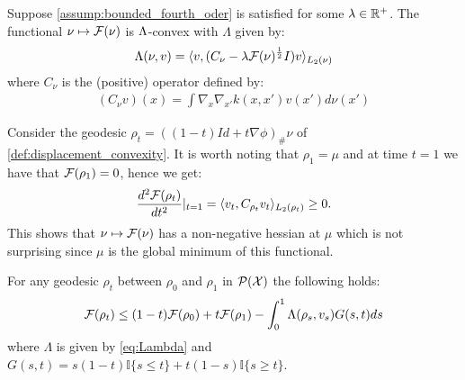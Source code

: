 \begin{proposition}
\label{prop:lambda_convexity} Suppose \cref{assump:bounded_fourth_oder} is satisfied for some $\lambda \in {{\mathbb R}}^+$. The functional $\nu\mapsto {{\mathcal F}}(\nu)$ is $\text{\ensuremath{\Lambda}}$-convex
with $\Lambda$ given by:
\begin{equation}
\Lambda(\nu,v)=\langle v,(C_{\nu}-\lambda {{\mathcal F}}(\nu)^{\frac{1}{2}}I)v\rangle_{L_{2}(\nu)}\label{eq:Lambda}
\end{equation}
where $C_{\nu}$ is the (positive) operator defined by:
\begin{align}\label{eq:positive_operator_C}
	(C_{\nu}v)(x)=\int\nabla_{x}\nabla_{x'}k(x,x')v(x')d\nu(x')
\end{align}
\end{proposition}
%
%
Consider the geodesic $\rho_{t}=((1-t)Id+t\nabla\phi)_{\#}\nu$ of \cref{def:displacement_convexity}. It is worth noting that $\rho_{1}=\mu$ and at time $t=1$ we have
that ${{\mathcal F}}(\rho_{1})=0$, hence we get:
\[
\frac{d^{2}{{\mathcal F}}(\rho_{t})}{dt^{2}}\vert_{t=1}=\langle v_{t},C_{\rho_{t}}v_{t}\rangle_{L_{2}(\rho_{t})}\geq0.
\]
This shows that $\nu\mapsto {{\mathcal F}}(\nu)$ has a non-negative
hessian at $\mu$ which is not surprising since $\mu$ is the global
minimum of this functional.
\begin{corollary}\label{cor:integral_lambda_convexity}
For any geodesic $\rho_{t}$ between
$\rho_{0}$ and $\rho_{1}$ in $\mathcal{P}({{\mathcal X}})$ the following holds:
\begin{equation}
{{\mathcal F}}(\rho_{t})\leq(1-t){{\mathcal F}}(\rho_{0})+t{{\mathcal F}}(\rho_{1})-\int_{0}^{1}\Lambda(\rho_{s},v_{s})G(s,t)ds\label{eq:integral_lambda_convexity}
\end{equation}
where $\Lambda$ is given by \cref{eq:Lambda} and $G(s,t)=s(1-t) \mathbb{I}\{s\leq t\}
+t(1-s) \mathbb{I}\{s\geq t\}$.
\end{corollary}
%

